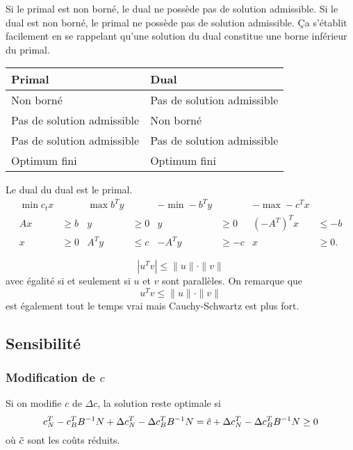 \begin{mycorr}
  Si le primal est non borné, le dual ne possède pas de solution admissible.
  Si le dual est non borné, le primal ne possède pas de solution admissible.
  Ça s'établit facilement en se rappelant qu'une solution du dual
  constitue une borne inférieur du primal.
\end{mycorr}
\begin{center}
  \begin{tabular}{l|l}
    Primal & Dual\\
    \hline
    Non borné & Pas de solution admissible\\
    Pas de solution admissible & Non borné\\
    Pas de solution admissible & Pas de solution admissible\\
    Optimum fini & Optimum fini
  \end{tabular}
\end{center}

\begin{mytheo}
  Le dual du dual est le primal.
  \begin{align*}
    \min c_tx & & \max b^Ty & & -\min -b^Ty & & -\max -c^Tx\\
    Ax & \geq b & y & \geq 0 & y & \geq 0 & (-A^T)^Tx & \leq -b\\
    x & \geq 0 & A^Ty & \leq c & -A^Ty & \geq -c & x & \geq 0.
  \end{align*}
\end{mytheo}

\begin{mytheo}
  \[ |u^Tv| \leq \|u\| \cdot \|v\| \]
  avec égalité si et seulement si $u$ et $v$ sont parallèles.
  On remarque que
  \[ u^Tv \leq \|u\| \cdot \|v\| \]
  est également tout le temps vrai mais Cauchy-Schwartz est plus fort.
\end{mytheo}

\subsection{Sensibilité}
\subsubsection{Modification de $c$}
Si on modifie $c$ de $\Delta c$, la solution reste optimale si
\[ c_N^T - c_B^TB^{-1}N + \Delta c_N^T - \Delta c_B^TB^{-1}N
 = \tilde{c} + \Delta c_N^T - \Delta c_B^TB^{-1}N \geq 0 \]
où $\tilde{c}$ sont les coûts réduits.

